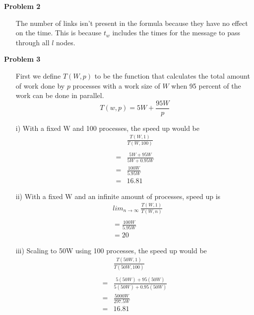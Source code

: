 \documentclass[12pt]{article}
\begin{document}
\textbf{Problem 2}
\begin{itemize}

    \item[] The number of links isn't present in the formula because they
            have no effect on the time. This is because $t_w$ includes the
            times for the message to pass through all $l$ nodes.

\end{itemize}

\textbf{Problem 3}
\begin{itemize}

    \item[] First we define $T(W, p)$ to be the function that calculates the
            total amount of work done by $p$ processes with a work size of
            $W$ when 95 percent of the work can be done in parallel.
        \begin{equation}
            T(w, p) = 5W + \frac{95W}{p}
        \end{equation}

    \item[i)] With a fixed W and 100 processes, the speed up would be
        \begin{equation}
            \begin{split}
                &\frac{T(W, 1)}{T(W, 100)} \\\\
                = &\frac{5W + 95W}{5W + 0.95W} \\
                = &\frac{100W}{5.95W} \\
                = &16.81
            \end{split}
        \end{equation}

    \item[ii)] With a fixed W and an infinite amount of processes, speed up is
        \begin{equation}
            \begin{split}
                &lim_{n\rightarrow\infty} \> \frac{T(W, 1)}{T(W, n)} \\\\
                &= \frac{100W}{5.95W} \\
                &= 20
            \end{split}
        \end{equation}

    \item[iii)] Scaling to 50W using 100 processes, the speed up would be
        \begin{equation}
            \begin{split}
                &\frac{T(50W, 1)}{T(50W, 100)} \\\\
                = &\frac{5(50W) + 95(50W)}{5(50W) + 0.95(50W)} \\
                = &\frac{5000W}{297.5W} \\
                = &16.81
            \end{split}
        \end{equation}

\end{itemize}
\end{document}
